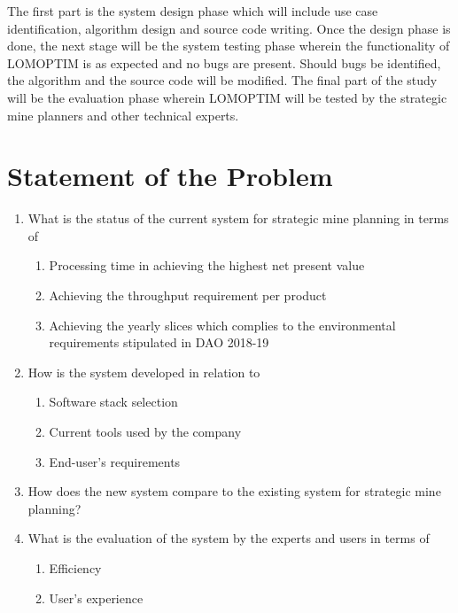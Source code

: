 \documentclass[12pt]{report}
\begin{document}
The first part is the system design phase which will include use case identification, algorithm design and source code writing.
Once the design phase is done, the next stage will be the system testing phase wherein the functionality of LOMOPTIM is as expected and no bugs are present.
Should bugs be identified, the algorithm and the source code will be modified.
The final part of the study will be the evaluation phase wherein LOMOPTIM will be tested by the strategic mine planners and other technical experts.

\section{Statement of the Problem}

\begin{enumerate}
    \item What is the status of the current system for strategic mine planning in terms of
        \begin{enumerate}
            \item Processing time in achieving the highest net present value
            \item Achieving the throughput requirement per product
            \item Achieving the yearly slices which complies to the environmental requirements stipulated in DAO 2018-19
        \end{enumerate}
    \item How is the system developed in relation to
            \begin{enumerate}
                \item Software stack selection
                \item Current tools used by the company
                \item End-user's requirements
            \end{enumerate}
    \item How does the new system compare to the existing system for strategic mine planning?
    \item What is the evaluation of the system by the experts and users in terms of
        \begin{enumerate}
            \item Efficiency
            \item User's experience
        \end{enumerate}
\end{enumerate}
\end{document}
